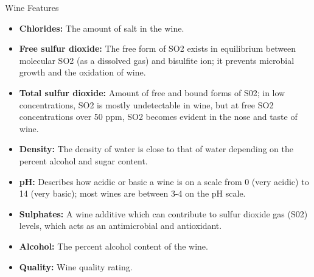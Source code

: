 \documentclass[
 size=14pt,
 paper=smartboard,  %
 mode=present, 		%
 display=slides, 	%
 style=tuliplab,  	%
 pauseslide,
 fleqn,leqno]{powerdot}
\begin{document}
\begin{slide}[toc=]{Wine Features}
	
	\begin{itemize}
	
		\item \textbf{Chlorides:} The amount of salt in the wine.
		\item \textbf{Free sulfur dioxide:} The free form of SO2 exists in equilibrium between molecular SO2 (as a dissolved gas) and bisulfite ion; it prevents microbial growth and the oxidation of wine.
		\item \textbf{Total sulfur dioxide:} Amount of free and bound forms of S02; in low concentrations, SO2 is mostly undetectable in wine, but at free SO2 concentrations over 50 ppm, SO2 becomes evident in the nose and taste of wine.
		\item \textbf{Density:} The density of water is close to that of water depending on the percent alcohol and sugar content.
		\item \textbf{pH:} Describes how acidic or basic a wine is on a scale from 0 (very acidic) to 14 (very basic); most wines are between 3-4 on the pH scale.
		\item \textbf{Sulphates:} A wine additive which can contribute to sulfur dioxide gas (S02) levels, which acts as an antimicrobial and antioxidant.
		\item \textbf{Alcohol:} The percent alcohol content of the wine.
		\item \textbf{Quality:} Wine quality rating.
	\end{itemize}
	
\end{slide}
\end{document}
